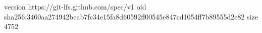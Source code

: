 version https://git-lfs.github.com/spec/v1
oid sha256:3460aa274942bcab7fc34e15fa8d60592ff00545e847cd1054ff7b89555d2e82
size 4752
